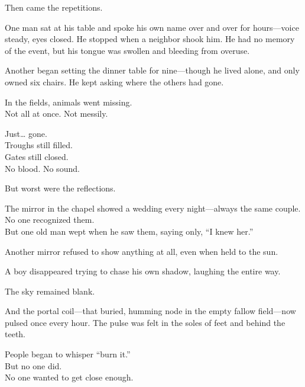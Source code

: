 \documentclass[12pt]{article}
\begin{document}
\vspace{0.5em}
Then came the repetitions.

\vspace{0.5em}
One man sat at his table and spoke his own name over and over for hours---voice steady, eyes closed. He stopped when a neighbor shook him. He had no memory of the event, but his tongue was swollen and bleeding from overuse.

\vspace{0.5em}
Another began setting the dinner table for nine---though he lived alone, and only owned six chairs. He kept asking where the others had gone.

\vspace{0.5em}
In the fields, animals went missing.\\
Not all at once. Not messily.

\vspace{0.5em}
Just\ldots{} gone.\\
Troughs still filled.\\
Gates still closed.\\
No blood. No sound.

\vspace{0.5em}
But worst were the reflections.

\vspace{0.5em}
The mirror in the chapel showed a wedding every night---always the same couple.\\
No one recognized them.\\
But one old man wept when he saw them, saying only, ``I knew her.''

\vspace{0.5em}
Another mirror refused to show anything at all, even when held to the sun.

\vspace{0.5em}
A boy disappeared trying to chase his own shadow, laughing the entire way.

\vspace{0.5em}
The sky remained blank.

\vspace{0.5em}
And the portal coil---that buried, humming node in the empty fallow field---now pulsed once every hour. The pulse was felt in the soles of feet and behind the teeth.

\vspace{0.5em}
People began to whisper ``burn it.''\\
But no one did.\\
No one wanted to get close enough.
\end{document}
